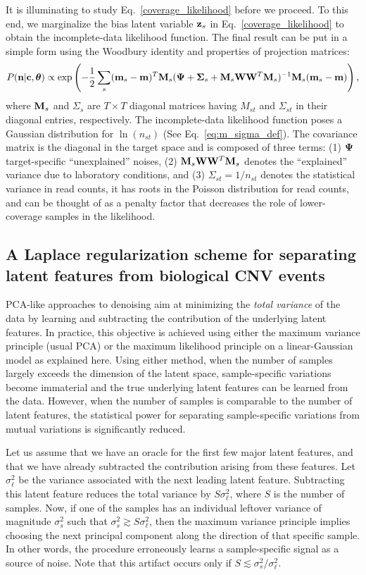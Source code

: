 \documentclass[nofootinbib,amssymb,amsmath]{revtex4}
\newcommand{\vc}{{\bf c}}
\newcommand{\vz}{{\bf z}}
\newcommand{\vn}{{\bf n}}
\newcommand{\vm}{{\bf m}}
\newcommand{\vM}{{\bf M}}
\newcommand{\vW}{{\bf W}}
\newcommand{\vPsi}{{\bf \Psi}}
\newcommand{\vSigma}{{\bf \Sigma}}
\newcommand{\vtheta}{{\boldsymbol \theta}}
\begin{document}
It is illuminating to study Eq.~\eqref{coverage_likelihood} before we proceed. To this end, we marginalize the bias latent variable $\vz_s$ in Eq.~\eqref{coverage_likelihood} to obtain the incomplete-data likelihood function. The final result can be put in a simple form using the Woodbury identity and properties of projection matrices:
%
\begin{equation}
P(\vn | \vc, \vtheta) \propto \exp \left( -\frac{1}{2} \sum_s (\vm_s - \vm)^T \vM_s (\vPsi + \vSigma_s + \vM_s \vW \vW^T \vM_s)^{-1} \vM_s (\vm_s - \vm) \right),
\label{marginalized coverage_likelihood}
\end{equation}
%
where $\vM_s$ and $\Sigma_{s}$ are $T \times T$ diagonal matrices having $M_{st}$ and $\Sigma_{st}$ in their diagonal entries, respectively. The incomplete-data likelihood function poses a Gaussian distribution for $\ln(n_{st})$ (See Eq.~\ref{eq:m_sigma_def}). The covariance matrix is the diagonal in the target space and is composed of three terms: (1) $\vPsi$ target-specific ``unexplained'' noises, (2) $\vM_s \vW \vW^T \vM_s$ denotes the ``explained'' variance due to laboratory conditions, and (3) $\Sigma_{st} = 1/n_{st}$ denotes the statistical variance in read counts, it has roots in the Poisson distribution for read counts, and can be thought of as a penalty factor that decreases the role of lower-coverage samples in the likelihood.

\subsection{A Laplace regularization scheme for separating latent features from biological CNV events}
PCA-like approaches to denoising aim at minimizing the {\em total variance} of the data by learning and subtracting the contribution of the underlying latent features. In practice, this objective is achieved using either the maximum variance principle (usual PCA) or the maximum likelihood principle on a linear-Gaussian model as explained here. Using either method, when the number of samples largely exceeds the dimension of the latent space, sample-specific variations become immaterial and the true underlying latent features can be learned from the data. However, when the number of samples is comparable to the number of latent features, the statistical power for separating sample-specific variations from mutual variations is significantly reduced.

Let us assume that we have an oracle for the first few major latent features, and that we have already subtracted the contribution arising from these features. Let $\sigma_\ell^2$ be the variance associated with the next leading latent feature. Subtracting this latent feature reduces the total variance by $S\sigma_\ell^2$, where $S$ is the number of samples. Now, if one of the samples has an individual leftover variance of magnitude $\sigma_s^2$ such that $\sigma_s^2 \gtrsim S\sigma_\ell^2$, then the maximum variance principle implies choosing the next principal component along the direction of that specific sample. In other words, the procedure erroneously learns a sample-specific signal as a source of noise. Note that this artifact occurs only if $S \lesssim \sigma_s^2 / \sigma_\ell^2$.\\
\end{document}
